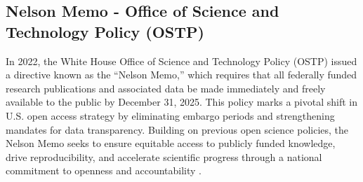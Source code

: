 \documentclass[final]{rc-book-2.14}
\begin{document}
\subsection{Nelson Memo - Office of Science and Technology Policy (OSTP)}
In 2022, the White House Office of Science and Technology Policy (OSTP) issued a directive known as the “Nelson Memo,” which requires that all federally funded research publications and associated data be made immediately and freely available to the public by December 31, 2025. This policy marks a pivotal shift in U.S. open access strategy by eliminating embargo periods and strengthening mandates for data transparency. Building on previous open science policies, the Nelson Memo seeks to ensure equitable access to publicly funded knowledge, drive reproducibility, and accelerate scientific progress through a national commitment to openness and accountability \cite{nelson_2023}.

\end{document}
